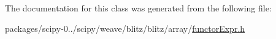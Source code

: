 The documentation for this class was generated from the following file\+:\begin{DoxyCompactItemize}
\item 
packages/scipy-\/0../scipy/weave/blitz/blitz/array/\hyperlink{functorExpr_8h}{functor\+Expr.\+h}\end{DoxyCompactItemize}
